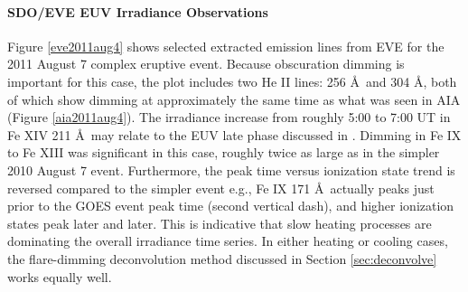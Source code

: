 \paragraph{SDO/EVE EUV Irradiance Observations}
Figure \ref{eve2011aug4} shows selected extracted emission lines from EVE for the 2011 August 7 complex eruptive event. Because obscuration dimming is important for this case, the plot includes two He II lines: 256 \AA\ and 304 \AA, both of which show dimming at approximately the same time as what was seen in AIA (Figure \ref{aia2011aug4}). The irradiance increase from roughly 5:00 to 7:00 UT in Fe XIV 211 \AA\ may relate to the EUV late phase discussed in \citet{Woods2011}. Dimming in Fe IX to Fe XIII was significant in this case, roughly twice as large as in the simpler 2010 August 7 event. Furthermore, the peak time versus ionization state trend is reversed compared to the simpler event e.g., Fe IX 171 \AA\ actually peaks just prior to the GOES event peak time (second vertical dash), and higher ionization states peak later and later. This is indicative that slow heating processes are dominating the overall irradiance time series. In either heating or cooling cases, the flare-dimming deconvolution method discussed in Section \ref{sec:deconvolve} works equally well. 

